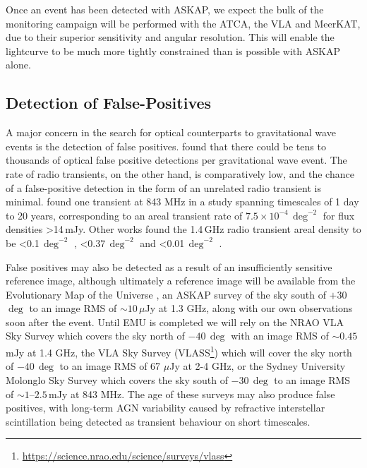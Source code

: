 Once an event has been detected with ASKAP, we expect the bulk of the monitoring campaign will be performed with the ATCA, the VLA and MeerKAT, due to their superior sensitivity and angular resolution. This will enable the lightcurve to be much more tightly constrained than is possible with ASKAP alone.

\vspace{-5pt}
\subsection{Detection of False-Positives}
\vspace{-5pt}
A major concern in the search for optical counterparts to gravitational wave events is the detection of false positives. \citet{2013ApJ...767..124N} found that there could be tens to thousands of optical false positive detections per gravitational wave event. The rate of radio transients, on the other hand, is comparatively low, and the chance of a false-positive detection in the form of an unrelated radio transient is minimal. \citet{2011MNRAS.412..634B} found one transient at 843 MHz in a study spanning timescales of 1 day to 20 years, corresponding to an areal transient rate of $7.5\times 10^{-4}$\,$\deg^{-2}$ for flux densities >14\,mJy. Other works found the 1.4\,GHz radio transient areal density to be <0.1\,$\deg^{-2}$ \citep[>1\,mJy on timescales of 0.5 to 7 years;][]{2016MNRAS.461.3314H}, <0.37\,$\deg^{-2}$ \citep[>0.2\,mJy on timescales of 1 week to 3 months;][]{2013ApJ...768..165M} and <0.01\,$\deg^{-2}$ \citep[>1.5\,mJy on daily timescales;][]{2018MNRAS.478.1784B}.

False positives may also be detected as a result of an insufficiently sensitive reference image, although ultimately a reference image will be available from the Evolutionary Map of the Universe \citep[EMU,][]{2011PASA...28..215N}, an ASKAP survey of the sky south of $+30$\,$\deg$ to an image RMS of $\sim10\,\mu$Jy at 1.3 GHz, along with our own observations soon after the event. Until EMU is completed we will rely on the NRAO VLA Sky Survey \citep[NVSS,][]{1998AJ....115.1693C} which covers the sky north of $-40\,\deg$ with an image RMS of $\sim 0.45$\,mJy at 1.4 GHz, the VLA Sky Survey (VLASS\footnote{\url{https://science.nrao.edu/science/surveys/vlass}}) which will cover the sky north of $-40\,\deg$ to an image RMS of 67 $\mu$Jy at 2-4 GHz, or the Sydney University Molonglo Sky Survey \citep[SUMSS,][]{1999AJ....117.1578B,2003MNRAS.342.1117M} which covers the sky south of $-30\,\deg$ to an image RMS of $\sim 1$--$2.5$\,mJy at 843 MHz. The age of these surveys may also produce false positives, with long-term AGN variability caused by refractive interstellar scintillation being detected as transient behaviour on short timescales.

